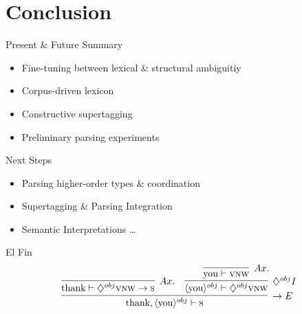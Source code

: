 \documentclass{beamer}
\newlength{\arrow}
\begin{document}
\section{Conclusion}

\begin{frame}{Present \& Future}
\alert{Summary}
	\begin{itemize}
		\item[] Fine-tuning between lexical \& structural ambiguitiy
		\item[] Corpus-driven lexicon
		\item[] Constructive supertagging 
		\item[] Preliminary parsing experiments
	\end{itemize}

\alert{Next Steps}
	\begin{itemize}
			\item[] Parsing higher-order types \& coordination
			\item[] Supertagging \& Parsing Integration 
			\item[] Semantic Interpretations \dots
		\end{itemize}
\end{frame}

\begin{frame}{El Fin}
\[
	\infer[\rightarrow E]{\text{thank}, \langle \text{you} \rangle^{obj} \vdash \textsc{s}}{
		\infer[Ax.]{\text{thank} \vdash \diamondsuit^{obj}\textsc{vnw} \to \textsc{s}}{}
		&
		\infer[\diamondsuit^{obj} I]{\langle \text{you} \rangle^{obj} \vdash \diamondsuit^{obj}\textsc{vnw}}{
		\infer[Ax.]{\text{you} \vdash \textsc{vnw}}{}
		}
	}
\]

\end{frame}
\end{document}
